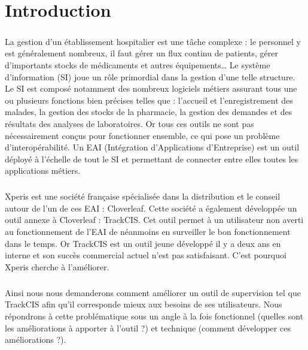 \raggedbottom\chapter*{Introduction}
	\paragraph{}
	La gestion d'un établissement hospitalier est une tâche complexe :
	le personnel y est généralement nombreux, il faut gérer un flux continu de
	patients, gérer d'importants stocks de médicaments et autres équipements\ldots
	Le système d'information (SI) joue un rôle primordial dans la gestion d'une
	telle structure. Le SI est composé notamment des nombreux logiciels métiers
	assurant tous une ou plusieurs fonctions bien précises telles que : l'accueil
	et l'enregistrement des malades, la gestion des stocks de la pharmacie, la gestion
	des demandes et des résultats des analyses de laboratoires. Or tous ces
	outils ne sont pas nécessairement conçus pour fonctionner ensemble, ce qui
	pose un problème d'interopérabilité. Un EAI (Intégration d'Applications d'Entreprise)
	est un outil déployé à l'échelle de tout le SI et permettant de connecter
	entre elles toutes les applications métiers.
	
	\paragraph{}
	Xperis est une société française spécialisée dans la distribution et le conseil
	autour de l'un de ces EAI : Cloverleaf. Cette société a également développée
	un outil annexe à Cloverleaf : TrackCIS. Cet outil permet à un utilisateur non
	averti au fonctionnement de l'EAI de néanmoins en surveiller le bon
	fonctionnement dans le temps. Or TrackCIS est un outil jeune développé il y a
	deux ans en interne et son succès commercial actuel n'est pas satisfaisant.
	C'est pourquoi Xperis cherche à l'améliorer.
	
	\paragraph{}
	Ainsi nous nous demanderons comment améliorer un outil de supervision tel que
	TrackCIS afin qu'il corresponde mieux aux besoins de ses utilisateurs.\newline
	Nous répondrons à cette problématique sous un angle à la fois fonctionnel
	(quelles sont les améliorations à apporter à l'outil ?) et technique (comment
	développer ces améliorations ?).
	
